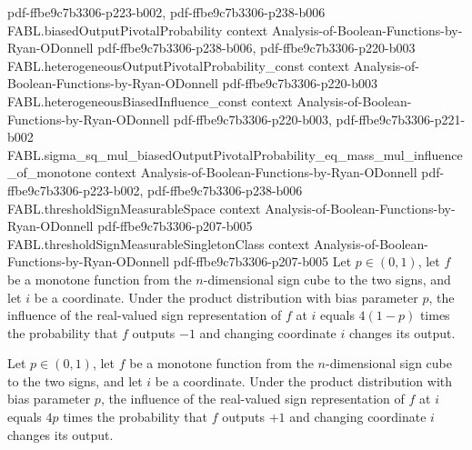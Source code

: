 \begin{theorem}
  {pdf-ffbe9c7b3306-p223-b002,
    pdf-ffbe9c7b3306-p238-b006}
\proofstep
  {FABL.biasedOutputPivotalProbability}
  {context}
  {Analysis-of-Boolean-Functions-by-Ryan-ODonnell}
  {pdf-ffbe9c7b3306-p238-b006,
    pdf-ffbe9c7b3306-p220-b003}
\proofstep
  {FABL.heterogeneousOutputPivotalProbability_const}
  {context}
  {Analysis-of-Boolean-Functions-by-Ryan-ODonnell}
  {pdf-ffbe9c7b3306-p220-b003}
\proofstep
  {FABL.heterogeneousBiasedInfluence_const}
  {context}
  {Analysis-of-Boolean-Functions-by-Ryan-ODonnell}
  {pdf-ffbe9c7b3306-p220-b003,
    pdf-ffbe9c7b3306-p221-b002}
\proofstep
  {FABL.sigma_sq_mul_biasedOutputPivotalProbability_eq_mass_mul_influence_of_monotone}
  {context}
  {Analysis-of-Boolean-Functions-by-Ryan-ODonnell}
  {pdf-ffbe9c7b3306-p223-b002,
    pdf-ffbe9c7b3306-p238-b006}
\proofstep
  {FABL.thresholdSignMeasurableSpace}
  {context}
  {Analysis-of-Boolean-Functions-by-Ryan-ODonnell}
  {pdf-ffbe9c7b3306-p207-b005}
\proofstep
  {FABL.thresholdSignMeasurableSingletonClass}
  {context}
  {Analysis-of-Boolean-Functions-by-Ryan-ODonnell}
  {pdf-ffbe9c7b3306-p207-b005}
Let $p\in(0,1)$, let $f$ be a monotone function from the $n$-dimensional sign cube to
the two signs, and let $i$ be a coordinate. Under the product distribution with bias
parameter $p$, the influence of the real-valued sign representation of $f$ at $i$ equals
$4(1-p)$ times the probability that $f$ outputs $-1$ and changing coordinate $i$ changes
its output.
\end{theorem}

\begin{theorem}
\label{FABL.productInfluence_eq_four_mul_bias_mul_onePivotalProbability_of_monotone}
\leanok
{}
Let $p\in(0,1)$, let $f$ be a monotone function from the $n$-dimensional sign cube to
the two signs, and let $i$ be a coordinate. Under the product distribution with bias
parameter $p$, the influence of the real-valued sign representation of $f$ at $i$ equals
$4p$ times the probability that $f$ outputs $+1$ and changing coordinate $i$ changes its
output.
\end{theorem}

